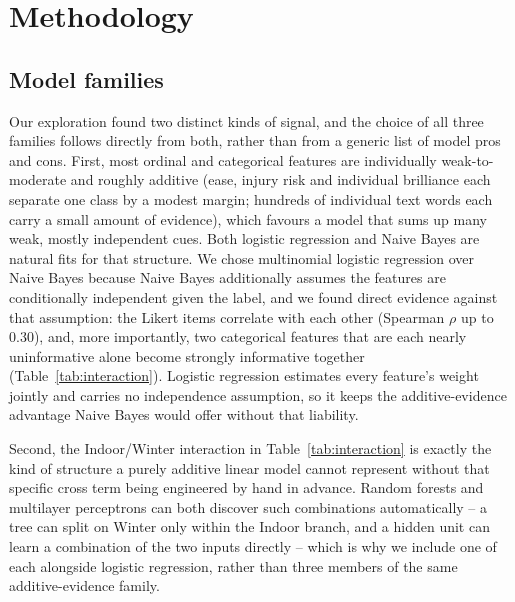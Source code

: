 \documentclass[12pt]{article}
\begin{document}
\section{Methodology}\label{sec:methodology}

\subsection{Model families}

Our exploration found two distinct kinds of signal, and the choice of all three families follows
directly from both, rather than from a generic list of model pros and cons. First, most ordinal and
categorical features are individually weak-to-moderate and roughly additive (ease, injury risk and
individual brilliance each separate one class by a modest margin; hundreds of individual text
words each carry a small amount of evidence), which favours a model that sums up many weak, mostly
independent cues. Both logistic regression and Naive Bayes are natural fits for that structure. We
chose multinomial logistic regression over Naive Bayes because Naive Bayes additionally assumes
the features are conditionally independent given the label, and we found direct evidence against
that assumption: the Likert items correlate with each other (Spearman $\rho$ up to 0.30), and, more
importantly, two categorical features that are each nearly uninformative alone become strongly
informative together (Table~\ref{tab:interaction}). Logistic regression estimates every feature's
weight jointly and carries no independence assumption, so it keeps the additive-evidence advantage
Naive Bayes would offer without that liability.

Second, the Indoor/Winter interaction in Table~\ref{tab:interaction} is exactly the kind of
structure a purely additive linear model cannot represent without that specific cross term being
engineered by hand in advance. Random forests and multilayer perceptrons can both discover such
combinations automatically -- a tree can split on Winter only within the Indoor branch, and a
hidden unit can learn a combination of the two inputs directly -- which is why we include one of
each alongside logistic regression, rather than three members of the same additive-evidence
family.
\end{document}
